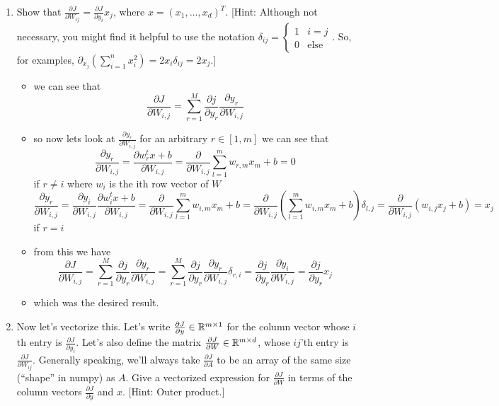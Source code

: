 \documentclass{article}
\theoremstyle{plain}
\theoremstyle{definition}
\begin{document}
\begin{enumerate}
\setcounter{enumi}{\value{saveenum}}
\item Show that $\frac{\partial J}{\partial W_{ij}}=\frac{\partial J}{\partial y_{i}}x_{j}$,
where $x=\left(x_{1},\ldots,x_{d}\right)^{T}$. {[}Hint: Although
not necessary, you might find it helpful to use the notation $\delta_{ij}=\begin{cases}
1 & i=j\\
0 & \text{else}
\end{cases}$. So, for examples, $\partial_{x_{j}}\left(\sum_{i=1}^{n}x_{i}^{2}\right)=2x_{i}\delta_{ij}=2x_{j}$.{]}

\begin{itemize}
    \color{blue}
    \item we can see that $$\frac{\partial J}{\partial W_{i,j}}=\sum_{r=1}^{M}\frac{\partial j}{\partial y_r}\frac{\partial y_r}{\partial W_{i,j}}$$
    \item so now lets look at $\frac{\partial y_r}{\partial W_{i,j}}$ for an arbitrary $r\in [1,m]$ we can see that $$\frac{\partial y_r}{\partial W_{i,j}}=\frac{\partial w_{r}^tx+b}{\partial W_{i,j}}=\frac{\partial}{\partial W_{i,j}}\sum_{l=1}^{m}w_{r,m}x_m+b=0$$ if $r\neq i$ where $w_i$ is the ith row vector of $W$ 
    $$\frac{\partial y_r}{\partial W_{i,j}}=\frac{\partial y_i}{\partial W_{i,j}}\frac{\partial w_{i}^tx+b}{\partial W_{i,j}}=\frac{\partial}{\partial W_{i,j}}\sum_{l=1}^{m}w_{i,m}x_m+b=\frac{\partial}{\partial W_{i,j}}(\sum_{l=1}^{m}w_{i,m}x_m+b)\delta_{l,j}=\frac{\partial}{\partial W_{i,j}}(w_{i,j}x_j+b)=x_j$$ if $r=i$
    \item from this we have $$\frac{\partial J}{\partial W_{i,j}}=\sum_{r=1}^{M}\frac{\partial j}{\partial y_r}\frac{\partial y_r}{\partial W_{i,j}}=\sum_{r=1}^{M}\frac{\partial j}{\partial y_r}\frac{\partial y_r}{\partial W_{i,j}}\delta_{r,i}=\frac{\partial j}{\partial y_r}\frac{\partial y_i}{\partial W_{i,j}}=\frac{\partial j}{\partial y_r}x_j$$
    \item which was the desired result. \blacksquare
    
\end{itemize}

\item Now let's vectorize this. Let's write $\frac{\partial J}{\partial y}\in\mathbb{R}^{m\times1}$
for the column vector whose $i$th entry is $\frac{\partial J}{\partial y_{i}}$.
Let's also define the matrix $\frac{\partial J}{\partial W}\in\mathbb{R}^{m\times d}$,
whose $ij$'th entry is $\frac{\partial J}{\partial W_{ij}}$. Generally
speaking, we'll always take $\frac{\partial J}{\partial A}$ to be
an array of the same size (``shape'' in numpy) as $A$. Give a vectorized
expression for $\frac{\partial J}{\partial W}$ in terms of the column
vectors $\frac{\partial J}{\partial y}$ and $x$. {[}Hint: Outer
product.{]}\\



\end{enumerate}
\end{document}
